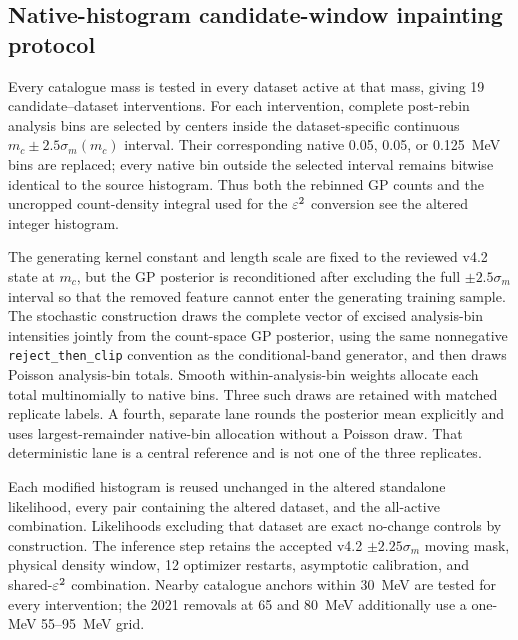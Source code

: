 \subsection{Native-histogram candidate-window inpainting protocol}
\label{app:candidate-inpainting-method}

Every catalogue mass is tested in every dataset active at that mass, giving
19 candidate--dataset interventions.  For each intervention, complete
post-rebin analysis bins are selected by centers inside the dataset-specific
continuous $m_c\pm2.5\sigma_m(m_c)$ interval.  Their corresponding native
0.05, 0.05, or 0.125~MeV bins are replaced; every native bin outside the
selected interval remains bitwise identical to the source histogram.  Thus
both the rebinned GP counts and the uncropped count-density integral used for
the $\varepsilon^2$ conversion see the altered integer histogram.

The generating kernel constant and length scale are fixed to the reviewed
v4.2 state at $m_c$, but the GP posterior is reconditioned after excluding the
full $\pm2.5\sigma_m$ interval so that the removed feature cannot enter the
generating training sample.  The stochastic construction draws the complete
vector of excised analysis-bin intensities jointly from the count-space GP
posterior, using the same nonnegative \texttt{reject\_then\_clip} convention
as the conditional-band generator, and then draws Poisson analysis-bin
totals.  Smooth within-analysis-bin weights allocate each total
multinomially to native bins.  Three such draws are retained with matched
replicate labels.  A fourth, separate lane rounds the posterior mean
explicitly and uses largest-remainder native-bin allocation without a
Poisson draw.  That deterministic lane is a central reference and is not one
of the three replicates.

Each modified histogram is reused unchanged in the altered standalone
likelihood, every pair containing the altered dataset, and the all-active
combination.  Likelihoods excluding that dataset are exact no-change controls
by construction.  The inference step retains the accepted v4.2
$\pm2.25\sigma_m$ moving mask, physical density window, 12 optimizer
restarts, asymptotic \CLs{} calibration, and shared-$\varepsilon^2$ combination.
Nearby catalogue anchors within 30~MeV are tested for every intervention; the
2021 removals at 65 and 80~MeV additionally use a one-MeV 55--95~MeV grid.

